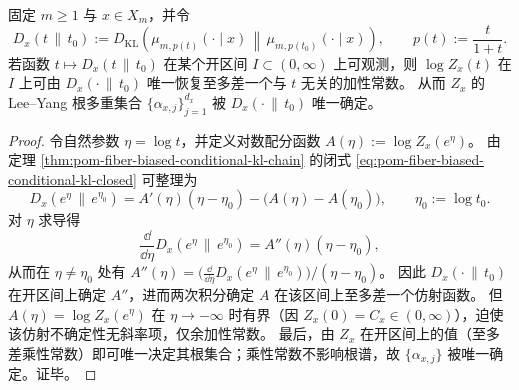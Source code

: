 \begin{proposition}\label{prop:pom-fiber-leyang-roots-identifiable-from-kl-curve}
固定 \(m\ge 1\) 与 \(x\in X_m\)，并令
\[
D_x(t\,\|\,t_0):=D_{\mathrm{KL}}\!\left(\mu_{m,p(t)}(\cdot\mid x)\,\middle\|\,\mu_{m,p(t_0)}(\cdot\mid x)\right),
\qquad
p(t):=\frac{t}{1+t}.
\]
若函数 \(t\mapsto D_x(t\,\|\,t_0)\) 在某个开区间 \(I\subset(0,\infty)\) 上可观测，则 \(\log Z_x(t)\) 在 \(I\) 上可由 \(D_x(\cdot\,\|\,t_0)\) 唯一恢复至多差一个与 \(t\) 无关的加性常数。
从而 \(Z_x\) 的 Lee--Yang 根多重集合 \(\{\alpha_{x,j}\}_{j=1}^{d_x}\) 被 \(D_x(\cdot\,\|\,t_0)\) 唯一确定。
\end{proposition}
\begin{proof}
令自然参数 \(\eta=\log t\)，并定义对数配分函数 \(A(\eta):=\log Z_x(e^\eta)\)。
由定理 \ref{thm:pom-fiber-biased-conditional-kl-chain} 的闭式 \eqref{eq:pom-fiber-biased-conditional-kl-closed} 可整理为
\[
D_x(e^\eta\,\|\,e^{\eta_0})
=A'(\eta)(\eta-\eta_0)-\bigl(A(\eta)-A(\eta_0)\bigr),
\qquad \eta_0:=\log t_0.
\]
对 \(\eta\) 求导得
\[
\frac{\dd}{\dd\eta}D_x(e^\eta\,\|\,e^{\eta_0})
=A''(\eta)(\eta-\eta_0),
\]
从而在 \(\eta\neq\eta_0\) 处有
\(
A''(\eta)=\bigl(\frac{\dd}{\dd\eta}D_x(e^\eta\,\|\,e^{\eta_0})\bigr)/(\eta-\eta_0)
\)。
因此 \(D_x(\cdot\,\|\,t_0)\) 在开区间上确定 \(A''\)，进而两次积分确定 \(A\) 在该区间上至多差一个仿射函数。
但 \(A(\eta)=\log Z_x(e^\eta)\) 在 \(\eta\to-\infty\) 时有界（因 \(Z_x(0)=C_x\in(0,\infty)\)），迫使该仿射不确定性无斜率项，仅余加性常数。
最后，由 \(Z_x\) 在开区间上的值（至多差乘性常数）即可唯一决定其根集合；乘性常数不影响根谱，故 \(\{\alpha_{x,j}\}\) 被唯一确定。证毕。
\end{proof}

